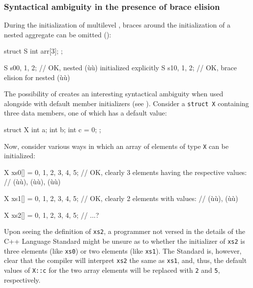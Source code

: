 \subsubsection[Syntactical ambiguity in the presence of brace elision]{Syntactical ambiguity in the presence of brace elision}\label{syntactical-ambiguity-in-the-presence-of-brace-elision}

During the initialization of multilevel , braces
around the initialization of a nested aggregate can be omitted
():

\begin{emcppslisting}[language=C++]
struct S
{
    int arr[3];
};

S s0{{0, 1, 2}};  // OK, nested (ù{}ù) initialized explicitly
S s1{0, 1, 2};    // OK, brace elision for nested (ù{}ù)
\end{emcppslisting}

\noindent The possibility of  creates an interesting
syntactical ambiguity when used alongside  with
default member initializers (see ). Consider a
\lstinline!struct!~\lstinline!X! containing three data members, one of which
has a default value:

\begin{emcppslisting}[language=C++]
struct X
{
    int a;
    int b;
    int c = 0;
};
\end{emcppslisting}

\noindent Now, consider various ways in which an array of elements of type
\lstinline!X! can be initialized:

\begin{emcppslisting}[language=C++]
X xs0[] = {{0, 1}, {2, 3}, {4, 5}};
    // OK, clearly 3 elements having the respective values:
    // (ù{}ù), (ù{}ù), (ù{}ù)

X xs1[] = {{0, 1, 2}, {3, 4, 5}};
    // OK, clearly 2 elements with values:
    // (ù{}ù), (ù{}ù)

X xs2[] = {0, 1, 2, 3, 4, 5};
    // ...?
\end{emcppslisting}

\noindent Upon seeing the definition of \lstinline!xs2!, a programmer not versed in
the details of the C++ Language Standard might be unsure as to whether the
initializer of \lstinline!xs2! is three elements (like \lstinline!xs0!) or two
elements (like \lstinline!xs1!). The Standard is, however, clear that the
compiler will interpret \lstinline!xs2! the same as \lstinline!xs1!, and,
thus, the default values of \lstinline!X::c! for the two array elements
will be replaced with \lstinline!2! and \lstinline!5!, respectively.

